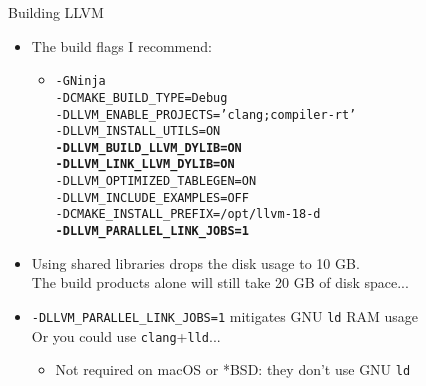\begin{frame}{Building LLVM}
\begin{itemize}
\item The build flags I recommend:\\
\begin{itemize}
\item[]\texttt{\small-GNinja \\
-DCMAKE\_BUILD\_TYPE=Debug\\
-DLLVM\_ENABLE\_PROJECTS='clang;compiler-rt' \\
-DLLVM\_INSTALL\_UTILS=ON \\
\textbf{-DLLVM\_BUILD\_LLVM\_DYLIB=ON \\
-DLLVM\_LINK\_LLVM\_DYLIB=ON} \\
-DLLVM\_OPTIMIZED\_TABLEGEN=ON \\
-DLLVM\_INCLUDE\_EXAMPLES=OFF \\
-DCMAKE\_INSTALL\_PREFIX=/opt/llvm-18-d \\
\textbf{-DLLVM\_PARALLEL\_LINK\_JOBS=1}\\
}
\end{itemize}
\item Using \alert{shared libraries} drops the disk usage to \alert{10 GB}.\\
{\footnotesize The build products alone will still take 20 GB of disk space...}
\item \texttt{-DLLVM\_PARALLEL\_LINK\_JOBS=1} mitigates GNU \texttt{ld} RAM usage\\
{\footnotesize Or you could use \texttt{clang}+\texttt{lld}...}
	\begin{itemize}
	\item Not required on macOS or *BSD: they don't use GNU \texttt{ld}
	\end{itemize}
\end{itemize}
\end{frame}


